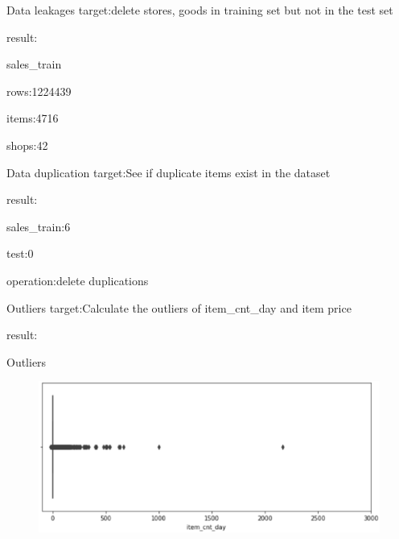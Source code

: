 \documentclass[
 size=14pt,
 paper=smartboard,  %
 mode=present, 		%
 display=slides, 	%
 style=tuliplab,  	%
 pauseslide,
 fleqn,leqno]{powerdot}
\begin{document}
\begin{slide}[toc=,bm=]{Data leakages}
  target:delete stores, goods in training set but not in the test set\par
  result:\par
  \setlength\parindent{2em}sales_train\par
  \setlength\parindent{4em}rows:1224439\par
    \setlength\parindent{4em}items:4716\par
    \setlength\parindent{4em}shops:42\par
\end{slide}


\begin{slide}[toc=,bm=]{Data duplication}
  target:See if duplicate items exist in the dataset\par
  result:\par
    \setlength\parindent{2em}sales_train:6\par
    \setlength\parindent{2em}test:0\par
  operation:delete duplications
\end{slide}

\begin{slide}[toc=,bm=]{Outliers}
  target:Calculate the outliers of item_cnt_day and item price\par
  result:
\end{slide}

\begin{slide}[toc=,bm=]{Outliers}
  \begin{figure}
    \includegraphics[scale=0.5]{picture/data_7.eps}
  \end{figure}
\end{slide}
\end{document}
